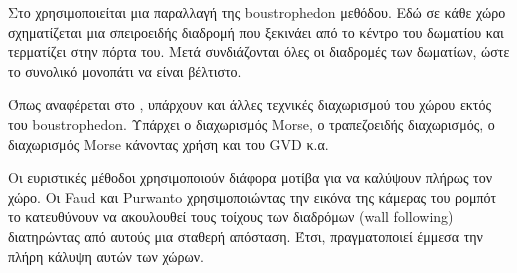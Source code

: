 Στο \cite{brown2016} χρησιμοποιείται μια παραλλαγή της boustrophedon μεθόδου. Εδώ σε κάθε χώρο σχηματίζεται μια σπειροειδής διαδρομή που ξεκινάει από το κέντρο του δωματίου και τερματίζει στην πόρτα του. Μετά συνδιάζονται όλες οι διαδρομές των δωματίων, ώστε το συνολικό μονοπάτι να είναι βέλτιστο.

Όπως αναφέρεται στο \cite{Galceran2013ASO}, υπάρχουν και άλλες τεχνικές διαχωρισμού του χώρου εκτός του boustrophedon. Υπάρχει ο διαχωρισμός Morse, ο τραπεζοειδής διαχωρισμός, ο διαχωρισμός Morse κάνοντας χρήση και του GVD κ.α.

Οι ευριστικές μέθοδοι χρησιμοποιούν διάφορα μοτίβα για να καλύψουν πλήρως τον χώρο. Oι Faud και Purwanto \cite{fuad2014} χρησιμοποιώντας την εικόνα της κάμερας του ρομπότ το κατευθύνουν να ακουλουθεί τους τοίχους των διαδρόμων (wall following) διατηρώντας από αυτούς μια σταθερή απόσταση. Έτσι, πραγματοποιεί έμμεσα την πλήρη κάλυψη αυτών των χώρων.



